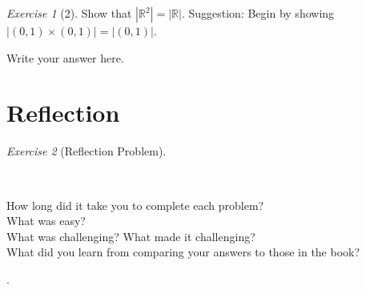 \documentclass[12pt]{amsart}
\makeatletter
\theoremstyle{remark}
\newtheorem*{exercise}{Exercise}%
\def\RR{\ensuremath{\mathbb R}}
\renewenvironment{proof}[1][\proofname]{\par\doublespacing
  \pushQED{\qed}%
  \normalfont \topsep6\p@\@plus6\p@\relax
  \list{}{%
    \settowidth{\leftmargin}{\itshape\proofname:\hskip\labelsep}%
    \setlength{\labelwidth}{0pt}%
    \setlength{\itemindent}{-\leftmargin}%
  }%
  \item[\hskip\labelsep\itshape#1\@addpunct{:}]\ignorespaces
}{%
  \popQED\endlist\@endpefalse
  \singlespacing
}
\theoremstyle{mycomment}
\makeatother
\begin{document}
\begin{exercise}[2] Show that $|\RR^{2}|=|\RR|$. Suggestion: Begin by showing $|(0,1)\times(0,1)|=|(0,1)|$.
 \begin{proof}
Write your answer here.
\end{proof}
\end{exercise}


\section*{Reflection}
\begin{exercise}[Reflection Problem] \ 

\begin{proof}[Answers] \ \\
\begin{description}
\item[How long did it take you to complete each problem?]
\item[What was easy?]
\item[What was challenging? What made it challenging?]
\item[What did you learn from comparing your answers to those in the book?]
\end{description}
\end{proof}
\end{exercise}.









 
\end{document}
